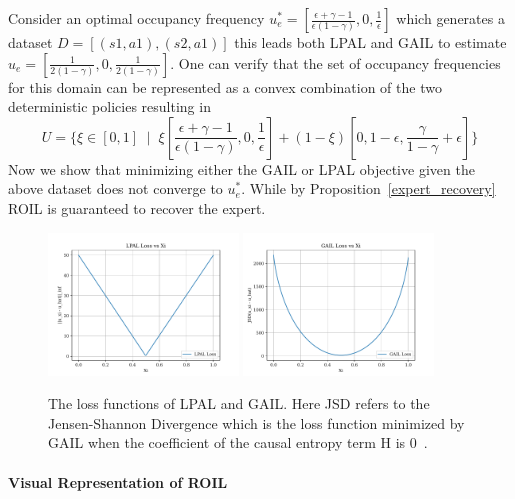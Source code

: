\documentclass[11pt]{uai2023}
\begin{document}
Consider an optimal occupancy frequency $u^*_e = [\frac{\epsilon + \gamma - 1}{\epsilon(1-\gamma)}, 0, \frac{1}{\epsilon}]$ which generates a dataset $D = [(s1, a1), (s2, a1)]$
this leads both LPAL and GAIL to estimate $\hat{u}_e = [\frac{1}{2(1-\gamma)}, 0, \frac{1}{2(1-\gamma)}]$. One can verify that the set of occupancy frequencies
for this domain can be represented as a convex combination of the two deterministic policies resulting in
\[U = \{\xi \in [0,1] \;\mid\; \xi[\frac{\epsilon+\gamma-1}{\epsilon(1-\gamma)}, 0, \frac{1}{\epsilon}] + (1-\xi)[0,1-\epsilon,\frac{\gamma}{1-\gamma}+\epsilon]\}\] 
Now we show that minimizing either the GAIL or LPAL objective given the above dataset does not converge to $u^*_e$. While by Proposition~\ref{expert_recovery} ROIL is guaranteed to recover the expert.

\begin{figure}[htbp]
	\centering
	\includegraphics[width=0.45\textwidth]{../src/plots/all_state/lpal_loss.pdf}
	\includegraphics[width=0.45\textwidth]{../src/plots/all_state/gail_loss.pdf}
	\caption{The loss functions of LPAL and GAIL. Here JSD refers to the Jensen-Shannon Divergence which is the loss function minimized by GAIL when the coefficient of the 
 causal entropy term H is 0~\cite{Ho2016}.}
	\label{fig:loss_of_LPAL_GAIL}
\end{figure}

\paragraph{Visual Representation of ROIL}
\end{document}
